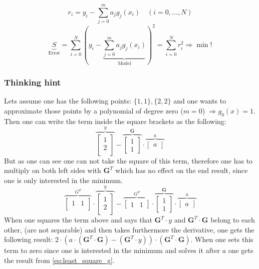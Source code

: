 \begin{equation}\label{eq:least_square}
r_i=y_i-\sum_{j=0}^m a_j g_j\left(x_i\right) \quad(i=0, \ldots, N)
\end{equation}
\begin{equation} \label{eq:least_square_squared}
\underbrace{S}_{\text{Error}}=\sum_{i=0}^N\left(y_i-\underbrace{\sum_{j=0}^m a_j g_j\left(x_i\right)}_{\text{Model}}\right)^2=\sum_{i=0}^N r_i^2 \Rightarrow \min !
\end{equation}
\subsubsection{Thinking hint}
Lets assume one has the following points: $\{1,1\},\{2,2\}$ and one wants to approximate those points by a polynomial of degree zero ($m=0$) $\Rightarrow g_0(x)=1$. Then one can write the term inside the square brackets as the following:
$$
\overbrace{\left[\begin{array}{c}
1 \\
2 \\
\end{array}\right]}^{y}-
\overbrace{\left[\begin{array}{c}
1\\
1
\end{array}\right]}^{\textbf{G}} \cdot
\overbrace{\left[\begin{array}{c}
a
\end{array}\right]}^{a}
$$
But as one can see one can not take the square of this term, therefore one has to multiply on both left sides with $\textbf{G}^T$ which has no effect on the end result, since one is only interested in the minimum.
$$
\overbrace{\left[\begin{array}{cc}
1 & 1\\
\end{array}\right]}^{\textbf{$G^T$}} \cdot
\overbrace{\left[\begin{array}{c}
1 \\
2 \\
\end{array}\right]}^{y}-
\overbrace{\left[\begin{array}{cc}
1 &1
\end{array}\right]}^{\textbf{$G^T$}} \cdot
\overbrace{\left[\begin{array}{c}
1\\
1
\end{array}\right]}^{\textbf{G}} \cdot
\overbrace{\left[\begin{array}{c}
a
\end{array}\right]}^{a}
$$
When one squares the term above and says that $\textbf{G}^T\cdot y$ and $\textbf{G}^T\cdot \textbf{G}$ belong to each other, (are not separable) and then takes furthermore the derivative, one gets the following result: $2\cdot \left(a\cdot (\textbf{G}^T\cdot \textbf{G})-(\textbf{G}^T\cdot y)  \right)\cdot (\textbf{G}^T\cdot \textbf{G})$. When one sets this term to zero since one is interested in the minimum and solves it after $a$ one gets the result from \autoref{eq:least_square_g}.
